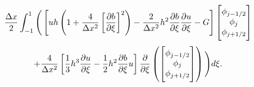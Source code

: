 \begin{multline*}
\frac{\Delta x}{2}\int_{-1 }^{1} \Bigg( \left[ uh \left(1 + \frac{4}{\Delta x^2} \left[\frac{\partial b}{\partial \xi}\right]^2 \right)  - \frac{2}{\Delta x^2} h^2 \frac{\partial b}{\partial \xi}  \frac{\partial u }{\partial \xi}  -  G \right] \begin{bmatrix} \TM
\phi_{j-1/2}\\\phi_j \\\phi_{j+1/2} \BM
\end{bmatrix}   \\ + \frac{4}{\Delta x^2} \left[\frac{1}{3}h^3 \frac{\partial {u}}{\partial \xi}    -     \frac{1}{2}h^2 \frac{\partial b}{\partial \xi} u    \right] \frac{\partial}{\partial \xi}\left(\begin{bmatrix} \TM
\phi_{j-1/2}\\\phi_j \\\phi_{j+1/2} \BM
\end{bmatrix} \right) \Bigg)d\xi.
\end{multline*}

